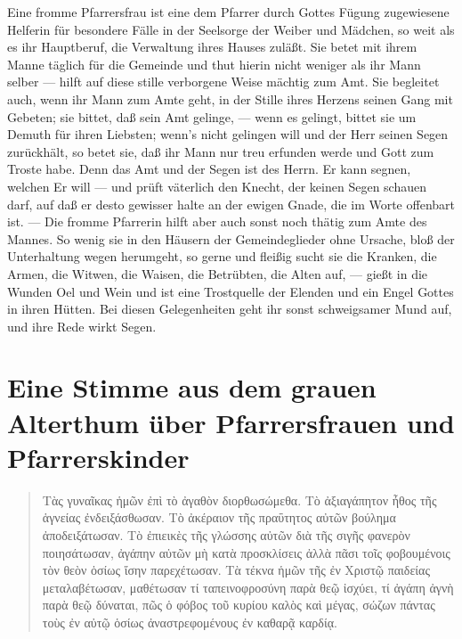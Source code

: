 Eine fromme Pfarrersfrau ist eine dem Pfarrer durch Gottes Fügung zugewiesene Helferin für besondere Fälle in der Seelsorge der Weiber und Mädchen, so weit als es ihr Hauptberuf, die Verwaltung ihres Hauses zuläßt. Sie betet mit ihrem Manne täglich für die Gemeinde und thut hierin nicht weniger als ihr Mann selber — hilft auf diese stille verborgene Weise
mächtig zum Amt. Sie begleitet auch, wenn ihr Mann zum Amte geht, in der Stille ihres Herzens seinen Gang mit Gebeten; sie bittet, daß sein Amt gelinge, — wenn es gelingt, bittet sie um Demuth für ihren Liebsten; wenn’s nicht gelingen will und der Herr seinen Segen zurückhält, so betet sie, daß ihr Mann nur treu erfunden werde und Gott zum Troste habe. Denn das Amt und der Segen ist des Herrn. Er kann segnen, welchen Er will — und prüft väterlich den Knecht, der keinen Segen schauen darf, auf daß er desto gewisser halte an der ewigen Gnade, die im Worte offenbart ist. — Die fromme Pfarrerin hilft aber auch sonst noch thätig zum Amte des Mannes. So wenig sie in den Häusern der Gemeindeglieder ohne Ursache, bloß der Unterhaltung wegen herumgeht, so gerne und fleißig sucht sie die Kranken, die Armen, die Witwen, die Waisen, die Betrübten, die Alten auf, — gießt in die Wunden Oel und Wein und ist eine Trostquelle der Elenden und ein Engel Gottes in ihren Hütten. Bei diesen Gelegenheiten geht ihr sonst schweigsamer Mund auf, und ihre Rede wirkt Segen.

\section[Eine Stimme aus dem grauen Alterthum]{Eine Stimme aus dem grauen Alterthum über Pfarrersfrauen und Pfarrerskinder}

\begin{quote}
Τὰς γυναῖκας ἡμῶν ἐπὶ τὸ ἀγαθὸν διορθωσώμεθα. Τὸ ἀξιαγάπητον ἦθος τῆς ἁγνείας ἐνδειξάσθωσαν. Τὸ ἀκέραιον τῆς πραΰτητος αὐτῶν βούλημα ἀποδειξάτωσαν. Τὸ ἐπιεικὲς τῆς γλώσσης αὐτῶν διὰ τῆς σιγῆς φανερὸν ποιησάτωσαν, ἀγάπην αὐτῶν μὴ κατὰ προσκλίσεις ἀλλὰ πᾶσι τοῖς φοβουμένοις τὸν θεὸν ὁσίως ἴσην παρεχέτωσαν. Τὰ τέκνα ἡμῶν τῆς ἐν Χριστῷ παιδείας μεταλαβέτωσαν, μαθέτωσαν τί ταπεινοφροσύνη παρὰ θεῷ ἰσχύει, τί ἀγάπη ἀγνὴ παρὰ θεῷ δύναται, πῶς ὁ φόβος τοῦ κυρίου καλὸς καὶ μέγας, σώζων πάντας τοὺς ἐν αὐτῷ ὁσίως ἀναστρεφομένους ἐν καθαρᾷ καρδίᾳ.
\end{quote}


